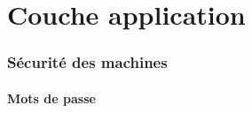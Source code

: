 \documentclass[a4paper]{article}
\begin{document}
\part{Couche application}










\section{Sécurité des machines}





\subsection{Mots de passe}
\end{document}
